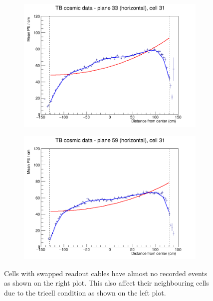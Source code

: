 \documentclass[12pt,a4paper]{article}
\begin{document}
\begin{figure}[h]
  \begin{subfigure}{0.5\textwidth}
    \includegraphics[width=\linewidth]{RelativeCalibrationResults/ep3de_033_031.png}
  \end{subfigure}
  \begin{subfigure}{0.5\textwidth}
    \includegraphics[width=\linewidth]{RelativeCalibrationResults/ep3de_059_031.png}
  \end{subfigure}
  \caption{Cells with swapped readout cables have almost no recorded events as shown on the right plot. This also affect their neighbouring cells due to the tricell condition as shown on the left plot.}
  \label{figAttenfitResultsEpoch3de_RefilledDiscrepancy}
\end{figure}
\end{document}
